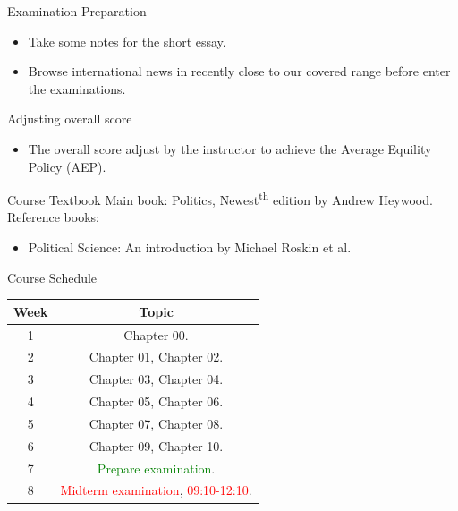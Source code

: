 \documentclass{beamer}
\begin{document}
\begin{frame}{Examination Preparation}
\begin{itemize}
\item Take some notes for the short essay.
\item Browse international news in recently close to our covered range before enter the examinations.
\end{itemize}
\begin{block}{Adjusting overall score}
\begin{itemize}
\item The overall score adjust by the instructor to achieve the Average Equility Policy (AEP).
\end{itemize}
\end{block}
\end{frame}
\begin{frame}{Course Textbook}
Main book: Politics, Newest\textsuperscript{th} edition by Andrew Heywood. \\
Reference books:
\begin{itemize}
\item Political Science: An introduction by Michael Roskin et al.
\end{itemize}
\end{frame}
\begin{frame}{Course Schedule}
\begin{center}
\begin{tabular}{|c|c|}
\hline
Week & Topic \\
\hline
1 & Chapter 00.\\
\hline
2 & Chapter 01, Chapter 02.\\
\hline
3 & Chapter 03, Chapter 04.\\
\hline
4 & Chapter 05, Chapter 06.\\
\hline
5 & Chapter 07, Chapter 08.\\
\hline
6 & Chapter 09, Chapter 10.\\
\hline
7 & \textcolor{Green}{Prepare examination}.\\
\hline
8 & \textcolor{red}{Midterm examination}, \textcolor{red}{09:10-12:10}.\\
\hline
\end{tabular}
\end{center}
\end{frame}
\end{document}
